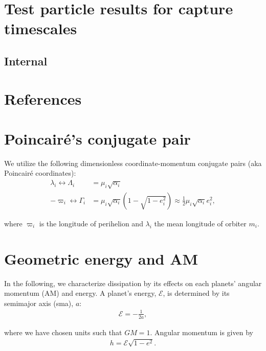 \documentclass[11pt]{article}
\begin{document}
\section{Test particle results for capture timescales}
\label{sec:orgb1ada24}

\subsection{Internal}
\label{sec:org3736fe9}

\section{References}
\label{sec:orgc794e6b}



\clearpage
\onecolumn
\appendix

\section{Poincair\'e's conjugate pair}
\label{sec:orgfa62695}
We utilize the following dimensionless coordinate-momentum conjugate
pairs (aka Poincair\'e coordinates):
\begin{align}
  \lambda_i \longleftrightarrow\Lambda_i &= \mu_i\sqrt{\alpha_i} \\
  -\varpi_i \longleftrightarrow\Gamma_i &= \mu_i\sqrt{\alpha_i}(1-\sqrt{1-e_i^2}) \approx \frac12\mu_i\sqrt{\alpha_i}e_i^2,
\end{align}

\noindent
where \(\varpi_i\) is the longitude of perihelion and \(\lambda_i\) the mean longitude
of orbiter \(m_i\).

\section{Geometric energy and AM}
\label{sec:org6cd2c51}
In the following, we characterize dissipation by its effects on each
planets' angular momentum (AM) and energy.  A planet's energy,
\(\mathcal E\), is determined by its semimajor axis (sma), \(a\):
\begin{align}
   \mathcal E = -\frac{1}{2a},
\end{align}
\noindent

\noindent
where we have chosen units such that \(GM=1\).
Angular momentum is given by
\begin{align}
h = \mathcal E \sqrt{1-e^2}.
\end{align}
\end{document}
